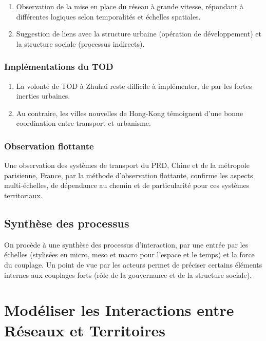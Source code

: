 \begin{enumerate}
	\item Observation de la mise en place du réseau à grande vitesse, répondant à différentes logiques selon temporalités et échelles spatiales.
	\item Suggestion de liens avec la structure urbaine (opération de développement) et la structure sociale (processus indirects).
\end{enumerate}


\subsubsection{Implémentations du TOD}

\begin{enumerate}
	\item La volonté de TOD à Zhuhai reste difficile à implémenter, de par les fortes inerties urbaines.
	\item Au contraire, les villes nouvelles de Hong-Kong témoignent d'une bonne coordination entre transport et urbanisme.
\end{enumerate}



\subsubsection{Observation flottante}

Une observation des systèmes de transport du PRD, Chine et de la métropole parisienne, France, par la méthode d'observation flottante, confirme les aspects multi-échelles, de dépendance au chemin et de particularité pour ces systèmes territoriaux.




\subsection*{Synthèse des processus}

On procède à une synthèse des processus d'interaction, par une entrée par les échelles (stylisées en micro, meso et macro pour l'espace et le temps) et la force du couplage. Un point de vue par les acteurs permet de préciser certains éléments internes aux couplages forts (rôle de la gouvernance et de la structure sociale).



\section{Modéliser les Interactions entre Réseaux et Territoires}

